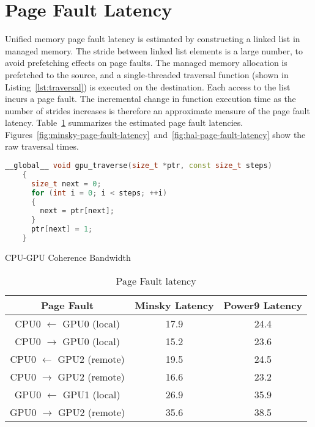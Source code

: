 \section{Page Fault Latency}

Unified memory page fault latency is estimated by constructing a linked list in managed memory.
The stride between linked list elements is a large number, to avoid prefetching effects on page faults.
The managed memory allocation is prefetched to the source, and a single-threaded traversal function (shown in Listing~\ref{lst:traversal}) is executed on the destination.
Each access to the list incurs a page fault.
The incremental change in function execution time as the number of strides increases is therefore an approximate measure of the page fault latency.
Table~\ref{tab:page-fault-latency} summarizes the estimated page fault latencies.
Figures~\ref{fig:minsky-page-fault-latency}~and~\ref{fig:hal-page-fault-latency} show the raw traversal times.

\begin{lstlisting}[language=c++, caption=Linked List Traversal, label=lst:traversal]
    __global__ void gpu_traverse(size_t *ptr, const size_t steps)
    {
      size_t next = 0;
      for (int i = 0; i < steps; ++i)
      {
        next = ptr[next];
      }
      ptr[next] = 1;
    }
\end{lstlisting}

\begin{algorithm}
    \caption{CPU-GPU Coherence Bandwidth}
    \label{alg:um-coherence-bw}
    \begin{algorithmic}[1]
    \Statex

    \EndFunction

    \end{algorithmic}
\end{algorithm}


\begin{table}[h]
	\centering
	\caption[]{Page Fault latency}
	\label{tab:page-fault-latency}
	\begin{tabular}{|c|c|c|}
		\hline
		\textbf{Page Fault} & \textbf{Minsky Latency} & \textbf{Power9 Latency} \\ \hline
		CPU0 $\leftarrow$ GPU0  (local) & 17.9 & 24.4   \\ \hline
        CPU0 $\rightarrow$ GPU0 (local) & 15.2 & 23.6  \\ \hline
        CPU0 $\leftarrow$ GPU2  (remote) & 19.5 & 24.5   \\ \hline
        CPU0 $\rightarrow$ GPU2 (remote) & 16.6 & 23.2  \\ \hline
        GPU0 $\leftarrow$ GPU1  (local) & 26.9 & 35.9   \\ \hline
		GPU0 $\rightarrow$ GPU2 (remote) & 35.6 & 38.5  \\ \hline
	\end{tabular}
\end{table}


